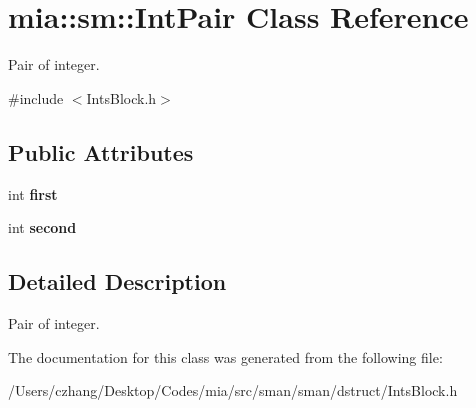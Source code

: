 \hypertarget{classmia_1_1sm_1_1_int_pair}{\section{mia\-:\-:sm\-:\-:Int\-Pair Class Reference}
\label{classmia_1_1sm_1_1_int_pair}
}


Pair of integer.  




{\ttfamily \#include $<$Ints\-Block.\-h$>$}

\subsection*{Public Attributes}
\begin{DoxyCompactItemize}
\item 
\hypertarget{classmia_1_1sm_1_1_int_pair_a6b26fd35105cf8003c149fc7bb291d77}{int {\bfseries first}}\label{classmia_1_1sm_1_1_int_pair_a6b26fd35105cf8003c149fc7bb291d77}

\item 
\hypertarget{classmia_1_1sm_1_1_int_pair_ac7ddf6cbe2480340524e6c7264be4253}{int {\bfseries second}}\label{classmia_1_1sm_1_1_int_pair_ac7ddf6cbe2480340524e6c7264be4253}

\end{DoxyCompactItemize}


\subsection{Detailed Description}
Pair of integer. 

The documentation for this class was generated from the following file\-:\begin{DoxyCompactItemize}
\item 
/\-Users/czhang/\-Desktop/\-Codes/mia/src/sman/sman/dstruct/Ints\-Block.\-h\end{DoxyCompactItemize}
